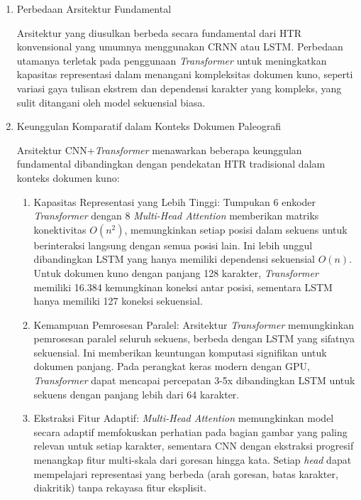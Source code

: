 \documentclass[12pt,a4paper]{article}
\begin{document}
\begin{enumerate}[leftmargin=*, labelindent=0pt, itemsep=1ex, topsep=0pt]

\item Perbedaan Arsitektur Fundamental
\label{para:perbedaan-arsitektur-fundamental}

Arsitektur yang diusulkan berbeda secara fundamental dari HTR konvensional yang umumnya menggunakan CRNN atau LSTM. Perbedaan utamanya terletak pada penggunaan \textit{Transformer} untuk meningkatkan kapasitas representasi dalam menangani kompleksitas dokumen kuno, seperti variasi gaya tulisan ekstrem dan dependensi karakter yang kompleks, yang sulit ditangani oleh model sekuensial biasa.

\item Keunggulan Komparatif dalam Konteks Dokumen Paleografi
\label{para:keunggulan-komparatif-paleografi}

Arsitektur CNN+\textit{Transformer} menawarkan beberapa keunggulan fundamental dibandingkan dengan pendekatan HTR tradisional dalam konteks dokumen kuno:

\begin{enumerate}[leftmargin=1.5em, labelsep=0.5em, itemindent=0pt, label=\alph*., topsep=0pt, parsep=0pt, itemsep=0pt]
      \item Kapasitas Representasi yang Lebih Tinggi: \mbox{} Tumpukan 6 enkoder \textit{Transformer} dengan 8 \textit{Multi-Head Attention} memberikan matriks konektivitas $O(n^2)$, memungkinkan setiap posisi dalam sekuens untuk berinteraksi langsung dengan semua posisi lain. Ini lebih unggul dibandingkan LSTM yang hanya memiliki dependensi sekuensial $O(n)$. Untuk dokumen kuno dengan panjang 128 karakter, \textit{Transformer} memiliki 16.384 kemungkinan koneksi antar posisi, sementara LSTM hanya memiliki 127 koneksi sekuensial.

      \item Kemampuan Pemrosesan Paralel: \mbox{} Arsitektur \textit{Transformer} memungkinkan pemrosesan paralel seluruh sekuens, berbeda dengan LSTM yang sifatnya sekuensial. Ini memberikan keuntungan komputasi signifikan untuk dokumen panjang. Pada perangkat keras modern dengan GPU, \textit{Transformer} dapat mencapai percepatan 3-5x dibandingkan LSTM untuk sekuens dengan panjang lebih dari 64 karakter.

      \item Ekstraksi Fitur Adaptif: \mbox{} \textit{Multi-Head Attention} memungkinkan model secara adaptif memfokuskan perhatian pada bagian gambar yang paling relevan untuk setiap karakter, sementara CNN dengan ekstraksi progresif menangkap fitur multi-skala dari goresan hingga kata. Setiap \textit{head} dapat mempelajari representasi yang berbeda (arah goresan, batas karakter, diakritik) tanpa rekayasa fitur eksplisit.


\end{enumerate}
\end{enumerate}
\end{document}
